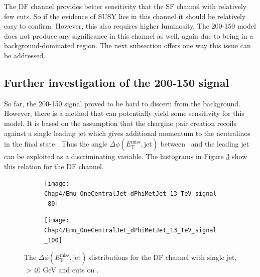 \newpage
The DF channel provides better sensitivity that the SF channel with relatively few cuts. So if the evidence of SUSY lies in this channel it should be relatively easy to confirm. However, this also requires higher luminosity. The 200-150 model does not produce any significance in this channel as well, again due to being in a background-dominated region. The next subsection offers one way this issue can be addressed.

\subsection{Further investigation of the 200-150 signal}
\label{subsec:200model}

So far, the 200-150 signal proved to be hard to discern from the background. However, there is a method that can potentially yield some sensitivity for this model. It is based on the assumption that the chargino pair creation recoils against a single leading jet which gives additional momentum to the neutralinos in the final state \citep{atlas2015search}. Thus the angle $\Delta\phi(E^{\text{miss}}_{\text{T}},\text{jet})$ between \met \, and the leading jet can be exploited as a discriminating variable. The histograms in Figure \ref{fig:DF_dPhi} show this relation for the DF channel. 

\begin{figure}[h!]
\captionsetup{width=0.8\textwidth}	   
	\begin{subfigure}[t]{0.5\textwidth}
		\label{fig:DF_dPhi80}
        \texttt{[image: Chap4/Emu\_OneCentralJet\_dPhiMetJet\_13\_TeV\_signal\_80]} 
        \end{subfigure} 
     \begin{subfigure}[t]{0.5\textwidth}
		\label{fig:DF_dPhi100}
        \texttt{[image: Chap4/Emu\_OneCentralJet\_dPhiMetJet\_13\_TeV\_signal\_100]} 
        \end{subfigure}      
\caption{The $\Delta\phi(E^{\text{miss}}_{\text{T}},\text{jet})$ distributions for the DF channel with single jet, \dileptonmass$>$40 GeV and cuts on \met.}	
        \label{fig:DF_dPhi}
\end{figure}

